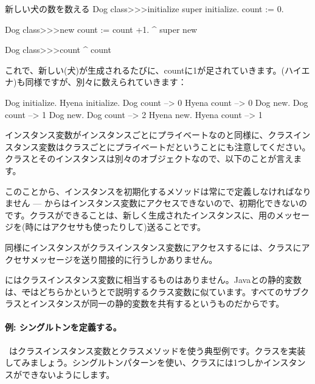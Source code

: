\documentclass[a4paper,10pt,twoside]{book}
\begin{document}
\begin{method}[dogcount]{新しい犬の数を数える}
Dog class>>>initialize
	super initialize.
	count := 0.

Dog class>>>new
	count := count +1.
	^ super new

Dog class>>>count
	^ count
\end{method}

これで、新しい(犬)が生成されるたびに、countに1が足されていきます。(ハイエナ)も同様ですが、別々に数えられていきます：
\begin{code}{}
Dog initialize.
Hyena initialize.
Dog count     --> 0
Hyena count --> 0
Dog new.
Dog count     --> 1
Dog new.
Dog count     --> 2
Hyena new.
Hyena count --> 1
\end{code}

インスタンス変数がインスタンスごとにプライベートなのと同様に、クラスインスタンス変数はクラスごとにプライベートだということにも注意してください。クラスとそのインスタンスは別々のオブジェクトなので、以下のことが言えます。

このことから、インスタンスを初期化するメソッドは常にで定義しなければなりません --- からはインスタンス変数にアクセスできないので、初期化できないのです。クラスができることは、新しく生成されたインスタンスに、用のメッセージを(時にはアクセサも使ったりして)送ることです。

同様にインスタンスがクラスインスタンス変数にアクセスするには、クラスにアクセサメッセージを送り間接的に行うしかありません。

にはクラスインスタンス変数に相当するものはありません。Javaとの静的変数は、\st ではどちらかというとで説明するクラス変数に似ています。すべてのサブクラスとインスタンスが同一の静的変数を共有するというものだからです。

\paragraph{例: シングルトンを定義する。}
~\cite{Alpe98a}はクラスインスタンス変数とクラスメソッドを使う典型例です。クラスを実装してみましょう。シングルトンパターンを使い、クラスには1つしかインスタンスができないようにします。
\end{document}
